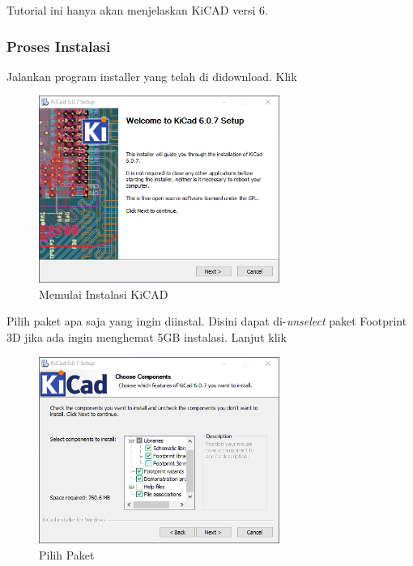 \documentclass[12pt]{book}
\begin{document}
	Tutorial ini hanya akan menjelaskan KiCAD versi 6.

	\newpage
	\subsubsection{Proses Instalasi}

	Jalankan program installer yang telah di didownload. Klik 

	\begin{figure}[!ht]
		\centering
		\includegraphics[width=0.7\textwidth]{images/installations/kicad_install_0}
		\caption{Memulai Instalasi KiCAD}
	\end{figure}

	Pilih paket apa saja yang ingin diinstal.
	Disini dapat di-\textit{unselect} paket Footprint 3D jika ada ingin menghemat 5GB instalasi.
	Lanjut klik 

	\begin{figure}[!ht]
		\centering
		\includegraphics[width=0.7\textwidth]{images/installations/kicad_install_1}
		\caption{Pilih Paket}
	\end{figure}
\end{document}

